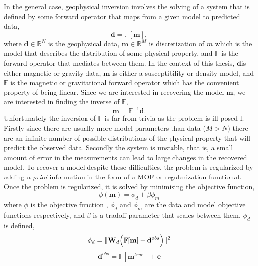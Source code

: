 In the general case, geophysical inversion involves the solving of a system that is defined by some forward operator that maps from a given model to predicted data,
\begin{equation}
\mathbf d = \mathbb F [\mathbf m],
\end{equation}
\label{eq:forwardProb}
where $\mathbf d \in \mathbb R^N$ is the geophysical data,  $\mathbf m \in \mathbb R^M$ is discretization of $m$ which is the model that describes the distribution of some physical property, and $\mathbb F$ is the forward operator that mediates between them. In the context of this thesis, $\mathbf d$is  either magnetic or gravity data, $\mathbf m$ is either a susceptibility or density model, and $\mathbb F$ is the magnetic or gravitational forward operator which has the convenient property of being linear. Since we are interested in recovering the model $\mathbf m$, we are interested in finding the inverse of $\mathbb F$,
\begin{equation}
\mathbf m= \mathbb F^{-1}\mathbf d.
\end{equation}
\label{eq:inverseProb}
Unfortunately the inversion of $\mathbb F$ is far from trivia as the problem is ill-posed l. Firstly since there are usually more model parameters than data ($M > N$) there are an infinite number of possible distributions of the physical property that will predict the observed data. Secondly the system is unstable, that is, a small amount of error in the measurements can lead to large changes in the recovered model. To recover a model despite these difficulties, the problem is regularized by adding \emph{a prioi} information in the form of a \ac{MOF} or regularization functional. Once the problem is regularized, it is solved by minimizing the objective function,
\begin{equation}
\phi(\mathbf m) = \phi_d + \beta \phi_m
\end{equation}
\label{eq:objectiveFunc}
where $\phi$ is the objective function , $\phi_d$ and $\phi_m$ are the data and model objective functions respectively, and $\beta$ is a tradoff parameter that scales between them. $\phi_d$ is defined,
\begin{equation}
\phi_d =\|\mathbf W_d\Big(\mathbb F [\mathbf m] - \mathbf d^{obs}\Big)\|^2\\
\end{equation}
\label{eq:phid}
\begin{equation}
 \mathbf d^{obs} = \mathbb F[\mathbf m^{true}] + \mathbf e
\end{equation}

